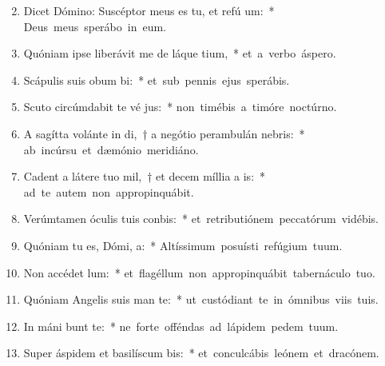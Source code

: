 \begin{flushleft}
\begin{enumerate}[leftmargin=*]
\setcounter{enumi}{1}

\item Dicet Dómino: Suscéptor meus es tu, et refú um:~* \mbox{Deus meus sperábo in eum.}

\item Quóniam ipse liberávit me de láque tium,~* \mbox{et a verbo áspero.}

\item Scápulis suis obum bi:~* \mbox{et sub pennis ejus sperábis.}

\item Scuto circúmdabit te vé jus:~* \mbox{non timébis a timóre noctúrno.}

\item A sagítta volánte in di,~† a negótio perambulán  nebris:~* \mbox{ab incúrsu et dæmónio meridiáno.}

\item Cadent a látere tuo mil,~† et decem míllia a  is:~* \mbox{ad te autem non appropinquábit.}

\item Verúmtamen óculis tuis conbis:~* \mbox{et retributiónem peccatórum vidébis.}

\item Quóniam tu es, Dómi,  a:~* \mbox{Altíssimum posuísti refúgium tuum.}

\item Non accédet   lum:~* \mbox{et flagéllum non appropinquábit tabernáculo tuo.}

\item Quóniam Angelis suis man  te:~* \mbox{ut custódiant te in ómnibus viis tuis.}

\item In máni bunt te:~* \mbox{ne forte offéndas ad lápidem pedem tuum.}

\item Super áspidem et basilíscum bis:~* \mbox{et conculcábis leónem et dracónem.}


\end{enumerate}
\end{flushleft}
